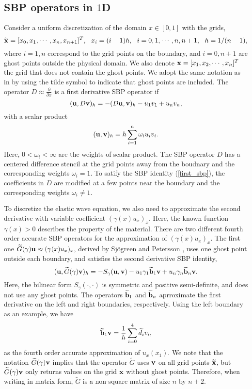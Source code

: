 \documentclass[a4paper]{article}
\newcommand{\wt}{\widetilde}
\begin{document}
\subsection{SBP operators in $1$D}
Consider a uniform discretization of the domain $x\in[0,1]$ with the grids,
\[\wt
{{\bf x}} = [x_0,x_1,\cdots,x_n,x_{n+1}]^T,\ \  x_i = (i-1)h,\ \ i = 0,1,\cdots,n,n+1,\ \ h = 1/(n-1),\]
where $i = 1,n$ correspond to the grid points on the boundary, and $i = 0,n+1$ are ghost points outside the physical domain.
We also denote ${\bf x} = [x_1,x_2,\cdots,x_n]^T$ the grid that does not  contain the ghost points. We adopt the same notation as in \cite{?} by using the tilde symbol to indicate that ghost points are included. The  operator $D \approx \frac{\partial }{\partial x}$ is a first derivative SBP operator if 
\begin{equation}\label{first_sbp}
({\bf u}, D{\bf v})_h = -(D{\bf u},{\bf v})_h - u_1v_1 + u_nv_n,
\end{equation}
with a scalar product
\begin{equation}\label{inner_product}
({\bf u},{\bf v})_h = h\sum_{i = 1}^{n}\omega_iu_iv_i.
\end{equation}
Here, $0<\omega_i < \infty $ are the weights of scalar product. The SBP operator $D$ has a centered difference stencil at the grid points away from the boudnary and the corresponding weights $\omega_i = 1$. To satify the SBP identity (\ref{first_sbp}), the coefficients in $D$ are  modified at a few points near the boundary and the corresponding weights $\omega_i \neq 1$.

To discretize the elastic wave equation, we also need to approximate the second derivative with variable coefficient $(\gamma(x)u_x)_x$. Here, the known function $\gamma(x)>0$ describes the property of the material. There are two different fourth order accurate SBP operators for the approximation of $(\gamma(x)u_x)_x$. The first one $\wt{G}(\gamma){\bf u} \approx (\gamma(x)u_x)_x $, derived by Sj\"ogreen and Petersson \cite{?}, uses one ghost point outside each boundary, and satisfies the second derivative SBP identity,
\begin{equation}\label{sbp_2nd_1}
({\bf u}, \wt{G}(\gamma){\bf v})_h = -S_\gamma({\bf u},{\bf v})-u_1\gamma_1\wt{\bf b}_1{\bf v} + u_n\gamma_n\wt{\bf b}_n {\bf v}.
\end{equation}
Here, the bilinear form $S_\gamma(\cdot,\cdot)$ is symmetric and positive semi-definite, and does not use any ghost points. The operators $\wt{\bf b}_1$ and $\wt{\bf b}_n$ aprroximate the first derivative on the left and right boundaries, respectively. Using the left boundary as an example, we have 
\[
\wt{\bf b}_1 {\bf v} = \frac{1}{h}\sum_{i=0}^{4} \wt{d}_i v_i,
\]
as the fourth order accurate approximation of $u_x(x_1)$. We note that the notation $\wt{G}(\gamma){\bf v}$ implies that the operator $\wt{G}$ uses ${\bf v}$ on all grid points $\wt{{\bf x}}$, but $\wt{G}(\gamma){\bf v}$ only returns values on the grid ${\bf x}$ without ghost points. Therefore, when writing in matrix form, $\wt{G}$ is a non-square matrix of size $n$ by $n+2$.
\end{document}

